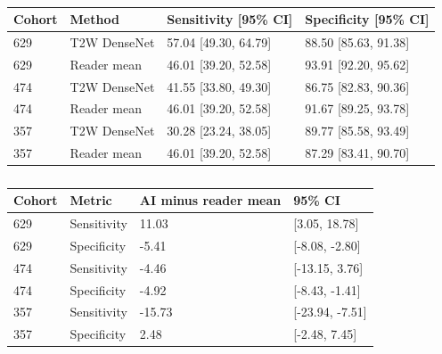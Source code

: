 \begin{table}[ht]
\centering
\caption{}
\label{tab:zw-reader-ci}
{\color{ZhixiangPink}\small
\begin{tabular}{llll}
\toprule
Cohort & Method & Sensitivity [95\% CI] & Specificity [95\% CI]\\
\midrule
629 & T2W DenseNet & 57.04 [49.30, 64.79] & 88.50 [85.63, 91.38]\\
629 & Reader mean & 46.01 [39.20, 52.58] & 93.91 [92.20, 95.62]\\
474 & T2W DenseNet & 41.55 [33.80, 49.30] & 86.75 [82.83, 90.36]\\
474 & Reader mean & 46.01 [39.20, 52.58] & 91.67 [89.25, 93.78]\\
357 & T2W DenseNet & 30.28 [23.24, 38.05] & 89.77 [85.58, 93.49]\\
357 & Reader mean & 46.01 [39.20, 52.58] & 87.29 [83.41, 90.70]\\
\bottomrule
\end{tabular}}
\end{table}

\begin{table}[ht]
\centering
\caption{}
\label{tab:zw-paired-differences}
{\color{ZhixiangPink}\small
\begin{tabular}{llll}
\toprule
Cohort & Metric & AI minus reader mean & 95\% CI\\
\midrule
629 & Sensitivity & 11.03 & [3.05, 18.78]\\
629 & Specificity & -5.41 & [-8.08, -2.80]\\
474 & Sensitivity & -4.46 & [-13.15, 3.76]\\
474 & Specificity & -4.92 & [-8.43, -1.41]\\
357 & Sensitivity & -15.73 & [-23.94, -7.51]\\
357 & Specificity & 2.48 & [-2.48, 7.45]\\
\bottomrule
\end{tabular}}
\end{table}

